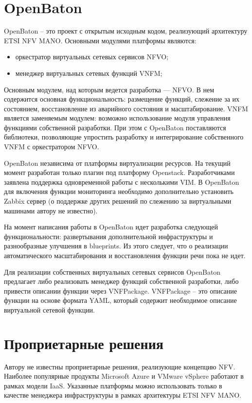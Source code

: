 \documentclass[oneside,final,14pt,a4paper]{extreport}
\begin{document}
\section{OpenBaton}
OpenBaton -- это проект с открытым исходным кодом, реализующий архитектуру ETSI NFV MANO. Основными модулями платформы являются:
\begin{itemize}
	\item оркестратор виртуальных сетевых сервисов NFVO;
	\item менеджер виртуальных сетевых функций VNFM;
\end{itemize}

Основным модулем, над которым ведется разработка --- NFVO. В нем содержится основная функциональность: размещение функций, слежение за их состоянием, восстановление из аварийного состояния и масштабирование. VNFM является заменяемым модулем: возможно использование модуля управления функциями собственной разработки. При этом с OpenBaton поставляются библиотеки, позволяющие упростить разработку и интегрирование собственного VNFM с оркестратором NFVO.

OpenBaton независима от платформы виртуализации ресурсов. На текущий момент разработан только плагин под платформу Openstack. Разработчиками заявлена поддержка одновременной работы с несколькими VIM. В OpenBaton для включения функции мониторинга необходимо дополнительно установить Zabbix сервер (о поддержке других решений по слежению за виртуальными машинами автору не известно).

На момент написания работы в OpenBaton идет разработка следующей функциональности: развертывания дополнительной инфраструктуры и разнообразные улучшения в blueprints. Из этого следует, что о реализации автоматического масштабирования и восстановления функции речи пока не идет.

Для реализации собственных виртуальных сетевых сервисов OpenBaton предлагает либо реализовать менеджер функций собственной разработки, либо привести описании функции через VNFPackage. VNFPackage -- это описание функции на основе формата YAML, который содержит необходимое описание виртуальной сетевой функции.\cite{bib:openbaton-official}


\section{Проприетарные решения}
Автору не известны проприетарные решения, реализующие концепцию NFV. Наиболее популярные продукты Microsoft Azure и VMware vSphere работают в рамках модели IaaS. Указанные платформы можно использовать только в качестве менеджера инфраструктуры в рамках архитектуры ETSI NFV MANO.
\end{document}
